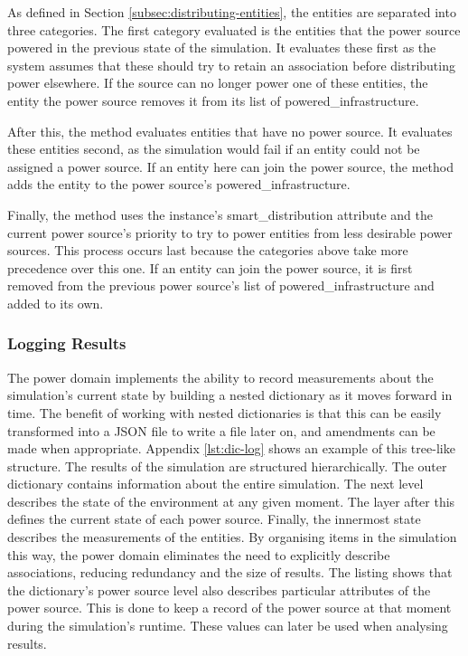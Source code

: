 \documentclass{l4proj}
\begin{document}
As defined in Section \ref{subsec:distributing-entities}, the entities are separated into three categories.
The first category evaluated is the entities that the power source powered in the previous state of the simulation.
It evaluates these first as the system assumes that these should try to retain an association before distributing power elsewhere.
If the source can no longer power one of these entities, the entity the power source removes it from its list of powered\_infrastructure.

After this, the method evaluates entities that have no power source.
It evaluates these entities second, as the simulation would fail if an entity could not be assigned a power source.
If an entity here can join the power source, the method adds the entity to the power source's powered\_infrastructure.

Finally, the method uses the instance's smart\_distribution attribute and the current power source's priority to try to power entities from less desirable power sources.
This process occurs last because the categories above take more precedence over this one.
If an entity can join the power source, it is first removed from the previous power source's list of powered\_infrastructure and added to its own.

\subsubsection{Logging Results}\label{imp:subsec:logging-results}
The power domain implements the ability to record measurements about the simulation's current state by building a nested dictionary as it moves forward in time.
The benefit of working with nested dictionaries is that this can be easily transformed into a JSON file to write a file later on, and amendments can be made when appropriate.
Appendix \ref{lst:dic-log} shows an example of this tree-like structure.
The results of the simulation are structured hierarchically.
The outer dictionary contains information about the entire simulation.
The next level describes the state of the environment at any given moment.
The layer after this defines the current state of each power source.
Finally, the innermost state describes the measurements of the entities.
By organising items in the simulation this way, the power domain eliminates the need to explicitly describe associations, reducing redundancy and the size of results.
The listing shows that the dictionary's power source level also describes particular attributes of the power source.
This is done to keep a record of the power source at that moment during the simulation's runtime.
These values can later be used when analysing results.
\end{document}
